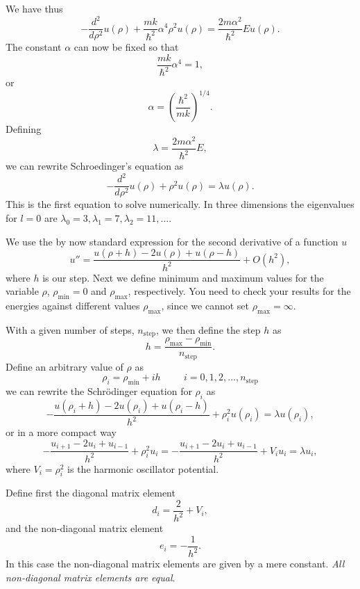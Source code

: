 \documentclass[%
oneside,                 %
final,                   %
10pt]{article}
\begin{document}
We have thus
\[
  -\frac{d^2}{d\rho^2} u(\rho) 
       + \frac{mk}{\hbar^2} \alpha^4\rho^2u(\rho)  = \frac{2m\alpha^2}{\hbar^2}E u(\rho) .
\]
The constant $\alpha$ can now be fixed
so that
\[
\frac{mk}{\hbar^2} \alpha^4 = 1,
\]
or 
\[
\alpha = \left(\frac{\hbar^2}{mk}\right)^{1/4}.
\]
Defining
\[
\lambda = \frac{2m\alpha^2}{\hbar^2}E,
\]
we can rewrite Schroedinger's equation as
\[
  -\frac{d^2}{d\rho^2} u(\rho) + \rho^2u(\rho)  = \lambda u(\rho) .
\]
This is the first equation to solve numerically. In three dimensions 
the eigenvalues for $l=0$ are 
$\lambda_0=3,\lambda_1=7,\lambda_2=11,\dots .$

We use the by now standard
expression for the second derivative of a function $u$
\begin{equation}
    u''=\frac{u(\rho+h) -2u(\rho) +u(\rho-h)}{h^2} +O(h^2),
    \label{eq:diffoperation}
\end{equation} 
where $h$ is our step.
Next we define minimum and maximum values for the variable $\rho$,
$\rho_{\mathrm{min}}=0$  and $\rho_{\mathrm{max}}$, respectively.
You need to check your results for the energies against different values
$\rho_{\mathrm{max}}$, since we cannot set
$\rho_{\mathrm{max}}=\infty$. 

With a given number of steps, $n_{\mathrm{step}}$, we then 
define the step $h$ as
\[
  h=\frac{\rho_{\mathrm{max}}-\rho_{\mathrm{min}} }{n_{\mathrm{step}}}.
\]
Define an arbitrary value of $\rho$ as 
\[
    \rho_i= \rho_{\mathrm{min}} + ih \hspace{1cm} i=0,1,2,\dots , n_{\mathrm{step}}
\]
we can rewrite the Schr\"odinger equation for $\rho_i$ as
\[
-\frac{u(\rho_i+h) -2u(\rho_i) +u(\rho_i-h)}{h^2}+\rho_i^2u(\rho_i)  = \lambda u(\rho_i),
\]
or in  a more compact way
\[
-\frac{u_{i+1} -2u_i +u_{i-1}}{h^2}+\rho_i^2u_i=-\frac{u_{i+1} -2u_i +u_{i-1} }{h^2}+V_iu_i  = \lambda u_i,
\]
where $V_i=\rho_i^2$ is the harmonic oscillator potential.

Define first the diagonal matrix element
\[
   d_i=\frac{2}{h^2}+V_i,
\]
and the non-diagonal matrix element 
\[
   e_i=-\frac{1}{h^2}.
\]
In this case the non-diagonal matrix elements are given by a mere constant. \emph{All non-diagonal matrix elements are equal}.
\end{document}
